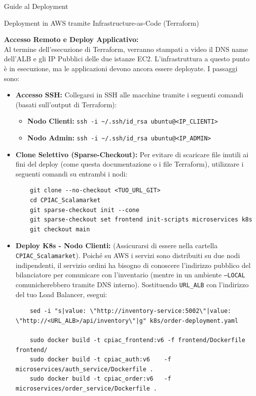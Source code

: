 \begin{mychapter}{Guide al Deployment}
\begin{mysection}{Deployment in AWS tramite Infrastructure-as-Code (Terraform)}
\begin{enumerate}
\end{enumerate}

\textbf{Accesso Remoto e Deploy Applicativo:}\\
Al termine dell'esecuzione di Terraform, verranno stampati a video il DNS name dell'ALB e gli IP Pubblici delle due istanze EC2. 
L'infrastruttura a questo punto è in esecuzione, ma le applicazioni devono ancora essere deployate. I passaggi sono:
\begin{itemize}
    \item \textbf{Accesso SSH:} Collegarsi in SSH alle macchine tramite i seguenti comandi (basati sull'output di Terraform):
    \begin{itemize}
        \item \textbf{Nodo Clienti:} \texttt{ssh -i \textasciitilde{}/.ssh/id\_rsa ubuntu@<IP\_CLIENTI>}
        \item \textbf{Nodo Admin:} \texttt{ssh -i \textasciitilde{}/.ssh/id\_rsa ubuntu@<IP\_ADMIN>}
    \end{itemize}
    \item \textbf{Clone Selettivo (Sparse-Checkout):} Per evitare di scaricare file inutili ai fini del deploy (come questa documentazione o i file Terraform), utilizzare i seguenti comandi su entrambi i nodi:
    \begin{verbatim}
    git clone --no-checkout <TUO_URL_GIT>
    cd CPIAC_Scalamarket
    git sparse-checkout init --cone
    git sparse-checkout set frontend init-scripts microservices k8s
    git checkout main
    \end{verbatim}
    \item \textbf{Deploy K8s - Nodo Clienti:} (Assicurarsi di essere nella cartella \texttt{CPIAC\_Scalamarket}). Poiché su AWS i servizi sono distribuiti su due nodi indipendenti, il servizio ordini ha bisogno di conoscere l'indirizzo pubblico del bilanciatore per comunicare con l'inventario (mentre in un ambiente \texttt{--LOCAL} comunicherebbero tramite DNS interno). Sostituendo \texttt{URL\_ALB} con l'indirizzo del tuo Load Balancer, esegui:
    \begin{verbatim}
    sed -i "s|value: \"http://inventory-service:5002\"|value: \"http://<URL_ALB>/api/inventory\"|g" k8s/order-deployment.yaml
    
    sudo docker build -t cpiac_frontend:v6 -f frontend/Dockerfile frontend/
    sudo docker build -t cpiac_auth:v6    -f microservices/auth_service/Dockerfile .
    sudo docker build -t cpiac_order:v6   -f microservices/order_service/Dockerfile .


\end{verbatim}
\end{itemize}
\end{mysection}
\end{mychapter}
